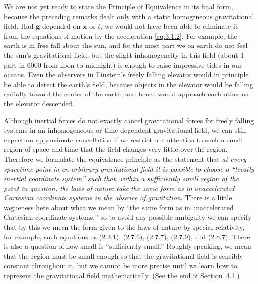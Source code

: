 We are not yet ready to state the Principle of Equivalence in its final form,
because the preceding remarks dealt only with a static homogeneous
gravitational field. Had $\mathbf g$ depended on $\mathbf x$ or $t$, we would
not have been able to eliminate it from the equations of motion by the
acceleration \eqref{eq:3.1.2}. For example, the earth is in free fall about
the sun, and for the most part we on earth do not feel the sun's
gravitational field, but the slight inhomogeneity in this field (about 1 part
in 6000 from noon to midnight) is enough to raise impressive tides in our
oceans. Even the observers in Einstein's freely falling elevator would in
principle be able to detect the earth's field, because objects in the
elevator would be falling radially toward the center of the earth, and hence
would approach each other as the elevator descended.

Although inertial forces do not exactly cancel gravitational forces for
freely falling systems in an inhomogeneous or time-dependent gravitational
field, we can still expect an approximate cancellation if we restrict our
attention to such a small region of space and time that the field changes
very little over the region. Therefore we formulate the equivalence principle
as the statement that \emph{at every spacetime point in an arbitrary
gravitational field it is possible to choose a ``locally inertial coordinate
system'' such that, within a sufficiently small region of the point in
question, the laws of nature take the same form as in unaccelerated Cartesian
coordinate systems in the absence of gravitation}. There is a little
vagueness here about what we mean by ``the same form as in unaccelerated
Cartesian coordinate systems,'' so to avoid any possible ambiguity we can
specify that by this we mean the form given to the laws of nature by special
relativity, for example, such equations as (2.3.1), (2.7.6), (2.7.7),
(2.7.9), and (2.8.7). There is also a question of how small is ``sufficiently
small.'' Roughly speaking, we mean that the region must be small enough so
that the gravitational field is sensibly constant throughout it, but we
cannot be more precise until we learn how to represent the gravitational
field mathematically. (See the end of Section~4.1.)

